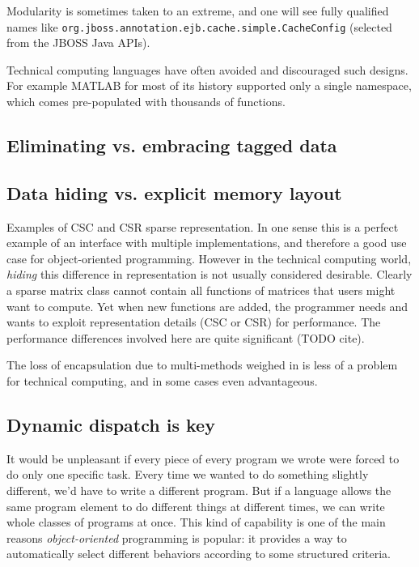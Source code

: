 Modularity is sometimes taken to an extreme, and one will see
fully qualified names like \texttt{org.jboss.annotation.ejb.cache.simple.CacheConfig}
(selected from the JBOSS Java APIs).

Technical computing languages have often avoided and discouraged such
designs. For example MATLAB for most of its history supported only a single
namespace, which comes pre-populated with thousands of functions.


\subsection{Eliminating vs. embracing tagged data}

\subsection{Data hiding vs. explicit memory layout}

Examples of CSC and CSR sparse representation.
In one sense this is a perfect example of an interface with multiple implementations,
and therefore a good use case for object-oriented programming.
However in the technical computing world, \emph{hiding} this difference in
representation is not usually considered desirable.
Clearly a sparse matrix class cannot contain all functions of matrices that users
might want to compute.
Yet when new functions are added, the programmer needs and wants to exploit
representation details (CSC or CSR) for performance.
The performance differences involved here are quite significant (TODO cite).

The loss of encapsulation due to multi-methods weighed in \cite{binarymethods}
is less of a problem for technical computing, and in some cases even
advantageous.

\subsection{Dynamic dispatch is key}

It would be unpleasant if every piece of every program we wrote were forced
to do only one specific task. Every time we wanted to do something slightly
different, we'd have to write a different program. But if a language
allows the same program element to do different things at different times,
we can write whole classes of programs at once. This kind of capability is
one of the main reasons \emph{object-oriented} programming is popular: it
provides a way to automatically select different behaviors according to
some structured criteria.

